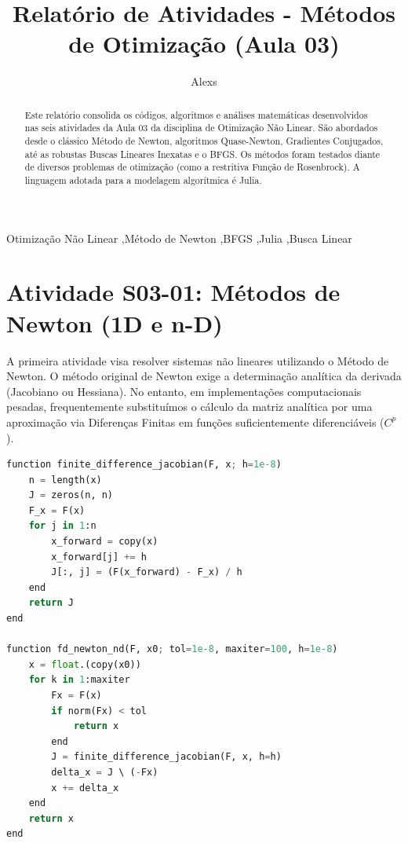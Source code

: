 \documentclass[preprint,12pt]{elsarticle}
\begin{document}
\begin{frontmatter}

\title{Relat\'orio de Atividades - M\'etodos de Otimiza\c{c}\~ao (Aula 03)}

\author[inst1]{Alexs}


\begin{abstract}
Este relat\'orio consolida os c\'odigos, algoritmos e an\'alises matem\'aticas desenvolvidos nas seis atividades da Aula 03 da disciplina de Otimiza\c{c}\~ao N\~ao Linear. S\~ao abordados desde o cl\'assico M\'etodo de Newton, algoritmos Quase-Newton, Gradientes Conjugados, at\'e as robustas Buscas Lineares Inexatas e o BFGS. Os m\'etodos foram testados diante de diversos problemas de otimiza\c{c}\~ao (como a restritiva Fun\c{c}\~ao de Rosenbrock). A linguagem adotada para a modelagem algor\'itmica \'e Julia.
\end{abstract}

\begin{keyword}
Otimiza\c{c}\~ao N\~ao Linear \sep M\'etodo de Newton \sep BFGS \sep Julia \sep Busca Linear
\end{keyword}

\end{frontmatter}

\section{Atividade S03-01: M\'etodos de Newton (1D e n-D)}
\label{sec:s0301}
A primeira atividade visa resolver sistemas n\~ao lineares utilizando o M\'etodo de Newton. 
O m\'etodo original de Newton exige a determina\c{c}\~ao anal\'itica da derivada (Jacobiano ou Hessiana). No entanto, em implementa\c{c}\~oes computacionais pesadas, frequentemente substitu\'imos o c\'alculo da matriz anal\'itica por uma aproxima\c{c}\~ao via Diferen\c{c}as Finitas em fun\c{c}\~oes suficientemente diferenci\'aveis ($C^p$).

\begin{lstlisting}[language=Python, caption={Exemplo Num\'erico de Newton N-Dimensional em Julia}]
function finite_difference_jacobian(F, x; h=1e-8)
    n = length(x)
    J = zeros(n, n)
    F_x = F(x)
    for j in 1:n
        x_forward = copy(x)
        x_forward[j] += h
        J[:, j] = (F(x_forward) - F_x) / h
    end
    return J
end

function fd_newton_nd(F, x0; tol=1e-8, maxiter=100, h=1e-8)
    x = float.(copy(x0))
    for k in 1:maxiter
        Fx = F(x)
        if norm(Fx) < tol
            return x
        end
        J = finite_difference_jacobian(F, x, h=h)
        delta_x = J \ (-Fx)
        x += delta_x
    end
    return x
end
\end{lstlisting}
\end{document}
